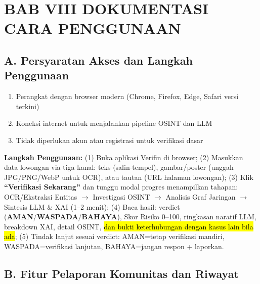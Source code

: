 \documentclass[12pt,a4paper]{article}
\newcommand{\revisi}[1]{\hl{#1}}
\begin{document}


\section*{BAB VIII DOKUMENTASI CARA PENGGUNAAN}

\vspace{-0.15cm}
\subsection*{A. Persyaratan Akses dan Langkah Penggunaan}

\vspace{-0.15cm}
\begin{enumerate}[label=\textbf{\arabic*.}, itemsep=0.5pt, topsep=1pt, parsep=0pt]
  \item Perangkat dengan browser modern (Chrome, Firefox, Edge, Safari versi terkini)
  \item Koneksi internet untuk menjalankan pipeline OSINT dan LLM
  \item Tidak diperlukan akun atau registrasi untuk verifikasi dasar
\end{enumerate}

\vspace{-0.15cm}
\noindent\textbf{Langkah Penggunaan:} (1) Buka aplikasi Verifin di browser; (2) Masukkan data lowongan via tiga kanal: teks (salin-tempel), gambar/poster (unggah JPG/PNG/WebP untuk OCR), atau tautan (URL halaman lowongan); (3) Klik \textbf{``Verifikasi Sekarang''} dan tunggu modal progres menampilkan tahapan: OCR/Ekstraksi Entitas $\to$ Investigasi OSINT $\to$ Analisis Graf Jaringan $\to$ Sintesis LLM \& XAI (1--2 menit); (4) Baca hasil: verdict (\textbf{AMAN}/\textbf{WASPADA}/\textbf{BAHAYA}), Skor Risiko 0--100, ringkasan naratif LLM, breakdown XAI, detail OSINT, \revisi{dan bukti keterhubungan dengan kasus lain bila ada}; (5) Tindak lanjut sesuai verdict: AMAN=tetap verifikasi mandiri, WASPADA=verifikasi lanjutan, BAHAYA=jangan respon + laporkan.

\vspace{-0.15cm}
\subsection*{B. Fitur Pelaporan Komunitas dan Riwayat}
\end{document}
